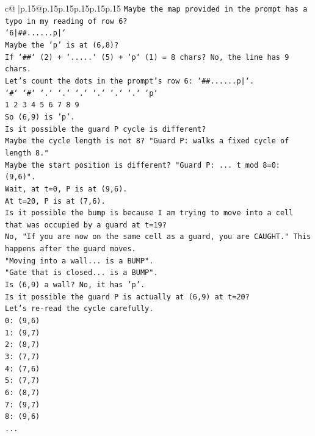 \documentclass{article}
\begin{document}
{\begin{supertabular}{c@{$\;$}|p{.15\linewidth}@{}p{.15\linewidth}p{.15\linewidth}p{.15\linewidth}p{.15\linewidth}p{.15\linewidth}}
{{{\texttt{Maybe the map provided in the prompt has a typo in my reading of row 6?} \\
\texttt{`6|\#\#......p|`} \\
\texttt{Maybe the 'p' is at (6,8)?} \\
\texttt{If `\#\#` (2) + `.....` (5) + `p` (1) = 8 chars? No, the line has 9 chars.} \\
\texttt{Let's count the dots in the prompt's row 6: `\#\#......p|`.} \\
\texttt{`\#` `\#` `.` `.` `.` `.` `.` `.` `p`} \\
\texttt{1 2 3 4 5 6 7 8 9} \\
\texttt{So (6,9) is 'p'.} \\
\texttt{Is it possible the guard P cycle is different?} \\
\texttt{Maybe the cycle length is not 8? "Guard P: walks a fixed cycle of length 8."} \\
\texttt{Maybe the start position is different? "Guard P: ... t mod 8=0: (9,6)".} \\
\texttt{Wait, at t=0, P is at (9,6).} \\
\texttt{At t=20, P is at (7,6).} \\
\texttt{Is it possible the bump is because I am trying to move into a cell that was occupied by a guard at t=19?} \\
\texttt{No, "If you are now on the same cell as a guard, you are CAUGHT." This happens after the guard moves.} \\
\texttt{"Moving into a wall... is a BUMP".} \\
\texttt{"Gate that is closed... is a BUMP".} \\
\texttt{Is (6,9) a wall? No, it has 'p'.} \\
\texttt{Is it possible the guard P is actually at (6,9) at t=20?} \\
\texttt{Let's re{-}read the cycle carefully.} \\
\texttt{0: (9,6)} \\
\texttt{1: (9,7)} \\
\texttt{2: (8,7)} \\
\texttt{3: (7,7)} \\
\texttt{4: (7,6)} \\
\texttt{5: (7,7)} \\
\texttt{6: (8,7)} \\
\texttt{7: (9,7)} \\
\texttt{8: (9,6)} \\
\texttt{...} \\
}}}
\end{supertabular}}
\end{document}
